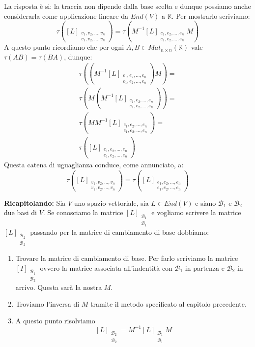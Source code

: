 La risposta \`e si: la traccia non dipende dalla base scelta e dunque possiamo
anche considerarla come applicazione lineare da $End(V)$ a $\mathbb{K}$.
Per mostrarlo scriviamo:
\begin{equation*}
	\tau \left(
	[L]_{\substack{
			v_1, v_2, \dots, v_n \\
			v_1, v_2, \dots, v_n
		}}
	\right) =
	\tau \left(
	M^{-1} [L]_{\substack{
			e_1, e_2, \dots, e_n \\
			e_1, e_2, \dots, e_n
		}} M
	\right)
\end{equation*}
A questo punto ricordiamo che per ogni $A, B \in Mat_{n \times n}(\mathbb{K})$
vale $\tau(AB) = \tau(BA)$, dunque:
\begin{gather*}
	\tau \left(
	\left(
		M^{-1}[L]_{\substack{
				e_1, e_2, \dots, e_n\\
				e_1, e_2, \dots, e_n
			}}
		\right) M
	\right) =\\
	\tau \left(
	M \left(
		M^{-1}[L]_{\substack{
				e_1, e_2, \dots, e_n\\
				e_1, e_2, \dots, e_n
			}}
		\right)
	\right) =\\
	\tau \left(
	M M^{-1} [L]_{\substack{
			e_1, e_2, \dots, e_n\\
			e_1, e_2, \dots, e_n
		}}
	\right) =\\
	\tau \left(
	[L]_{\substack{
			e_1, e_2, \dots, e_n \\
			e_1, e_2, \dots, e_n
		}}
	\right)
\end{gather*}
Questa catena di uguaglianza conduce, come annunciato, a:
\begin{equation*}
	\tau \left(
	[L]_{\substack{
			v_1, v_2, \dots, v_n \\
			v_1, v_2, \dots, v_n
		}}
	\right) =
	\tau \left(
	[L]_{\substack{
			e_1, e_2, \dots, e_n \\
			e_1, e_2, \dots, e_n
		}}
	\right)
\end{equation*}

\textbf{Ricapitolando:} Sia $V$ uno spazio vettoriale, sia $L \in End(V)$ e siano
$\mathcal{B}_1$ e $\mathcal{B}_2$ due basi di $V$. Se conosciamo la matrice
$[L]_{\substack{\mathcal{B}_1 \\ \mathcal{B}_1}}$ e vogliamo scrivere la matrice
$[L]_{\substack{\mathcal{B}_2 \\ \mathcal{B}_2}}$ passando per la matrice di
cambiamento di base dobbiamo:
\begin{enumerate}
	\item Trovare la matrice di cambiamento di base. Per farlo scriviamo la
	      matrice $[I]_{\substack{\mathcal{B}_1 \\ \mathcal{B}_2}}$ ovvero la
	      matrice associata all'indentit\`a con $\mathcal{B}_1$ in partenza e
	      $\mathcal{B}_2$ in arrivo. Questa sar\`a la nostra $M$.
	\item Troviamo l'inversa di $M$ tramite il metodo specificato al capitolo
	      precedente.
	\item A questo punto risolviamo
	      \[
		      [L]_{\substack{\mathcal{B}_2 \\ \mathcal{B}_2}} =
		      M^{-1} [L]_{\substack{\mathcal{B}_1 \\ \mathcal{B}_1}} M
	      \]
\end{enumerate}

